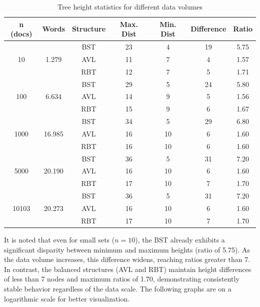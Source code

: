  \begin{table}[H]
     \centering
     \begin{tabular}{|c|c|c|c|c|c|c|}
     \hline
     \textbf{n (docs)} & \textbf{Words} & \textbf{Structure} & \textbf{Max. Dist} & \textbf{Min. Dist} & \textbf{Difference} & \textbf{Ratio} \\
     \hline
     \multirow{3}{*}{10} & \multirow{3}{*}{1.279} & BST & 23 & 4 & 19 & 5.75 \\
     & & AVL & 11 & 7 & 4 & 1.57 \\
     & & RBT & 12 & 7 & 5 & 1.71 \\
     \hline
     \multirow{3}{*}{100} & \multirow{3}{*}{6.634} & BST & 29 & 5 & 24 & 5.80 \\
     & & AVL & 14 & 9 & 5 & 1.56 \\
     & & RBT & 15 & 9 & 6 & 1.67 \\
     \hline
     \multirow{3}{*}{1000} & \multirow{3}{*}{16.985} & BST & 34 & 5 & 29 & 6.80 \\
     & & AVL & 16 & 10 & 6 & 1.60 \\
     & & RBT & 16 & 10 & 6 & 1.60 \\
     \hline
     \multirow{3}{*}{5000} & \multirow{3}{*}{20.190} & BST & 36 & 5 & 31 & 7.20 \\
     & & AVL & 16 & 10 & 6 & 1.60 \\
     & & RBT & 17 & 10 & 7 & 1.70 \\
     \hline
     \multirow{3}{*}{10103} & \multirow{3}{*}{20.273} & BST & 36 & 5 & 31 & 7.20 \\
     & & AVL & 16 & 10 & 6 & 1.60 \\
     & & RBT & 17 & 10 & 7 & 1.70 \\
     \hline
     \end{tabular}
     \caption{Tree height statistics for different data volumes}
     \label{tab:altura_completa}
 \end{table}

 It is noted that even for small sets ($n = 10$), the BST already exhibits a significant
 disparity between minimum and maximum heights (ratio of 5.75). As the data volume
 increases, this difference widens, reaching ratios greater than 7. In contrast, the balanced
 structures (AVL and RBT) maintain height differences of less than 7 nodes and maximum ratios of 1.70,
 demonstrating consistently stable behavior regardless of the data scale. The following graphs
 are on a logarithmic scale for better visualization.

